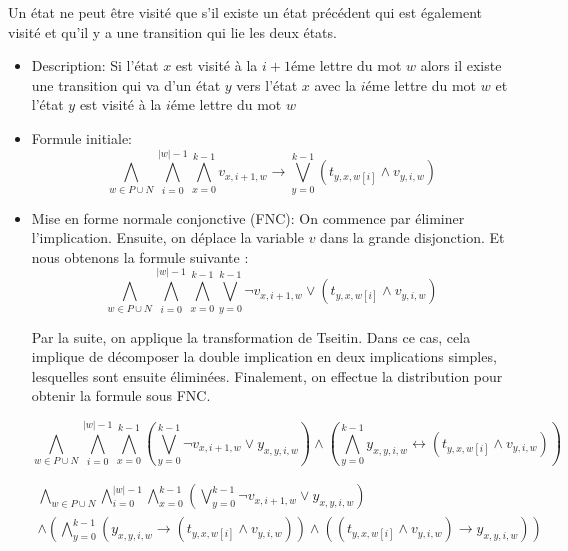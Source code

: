 \begin{tcolorbox}[defaultstyle,title=Contrainte 5]
    \label{contrainte 5}
    Un état ne peut être visité que s’il existe un état précédent qui est également visité et qu’il y a une transition qui lie les deux états.
    
    \begin{itemize}
        \item Description: Si l'état $x$ est visité à la $i+1$éme lettre du mot $w$ alors il existe une transition qui va d'un état $y$ vers l'état $x$ avec la $i$éme lettre du mot $w$ et l'état $y$ est visité à la $i$éme lettre du mot $w$ \\
        
        \item Formule initiale:
        \[ \bigwedge\limits_{w\in P \cup N} \bigwedge\limits_{i=0}^{|w|-1}\bigwedge\limits_{x=0}^{k-1} v_{x,i+1,w} \rightarrow \bigvee\limits_{y=0}^{k-1} (t_{y,x,w[i]} \land v_{y,i,w}) \]

        \item Mise en forme normale conjonctive (FNC): On commence par éliminer l'implication. Ensuite, on déplace la variable $v$ dans la grande disjonction. Et nous obtenons la formule suivante :
        \[ \bigwedge\limits_{w\in P \cup N} \bigwedge\limits_{i=0}^{|w|-1}\bigwedge\limits_{x=0}^{k-1} \bigvee\limits_{y=0}^{k-1} \lnot v_{x,i+1,w} \lor (t_{y,x,w[i]} \land v_{y,i,w}) \]

        Par la suite, on applique la transformation de Tseitin. Dans ce cas, cela implique de décomposer la double implication en deux implications simples, lesquelles sont ensuite éliminées. Finalement, on effectue la distribution pour obtenir la formule sous FNC.

        \[ \bigwedge_{w\in P \cup N}\bigwedge_{i=0}^{|w|-1}\bigwedge_{x=0}^{k-1} \left( \bigvee_{y=0}^{k-1} \lnot v_{x,i+1,w} \lor y_{x,y,i,w} \right)
        \land \left( \bigwedge_{y=0}^{k-1} y_{x,y,i,w} \leftrightarrow (t_{y,x,w[i]} \land v_{y,i,w}) \right) \]
        
        
        \begin{multline*}
        \bigwedge_{w\in P \cup N}\bigwedge_{i=0}^{|w|-1}\bigwedge_{x=0}^{k-1} \left( \bigvee_{y=0}^{k-1} \lnot v_{x,i+1,w} \lor y_{x,y,i,w} \right) \\
        \land \left( \bigwedge_{y=0}^{k-1} ( y_{x,y,i,w} \rightarrow (t_{y,x,w[i]} \land v_{y,i,w}) ) \land ((t_{y,x,w[i]} \land v_{y,i,w}) \rightarrow y_{x,y,i,w}) \right)
        \end{multline*}
        

\end{itemize}
\end{tcolorbox}
